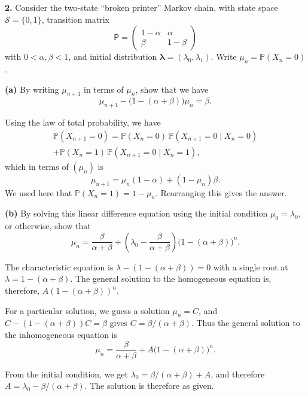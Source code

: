 \documentclass[
  a4paper,
]{article}
\theoremstyle{definition}
\theoremstyle{definition}
\theoremstyle{definition}
\theoremstyle{remark}
\begin{document}
\textbf{2.} Consider the two-state ``broken printer'' Markov chain, with state space \(\mathcal S = \{0,1\}\), transition matrix
\[ \mathsf P = \begin{pmatrix} 1-\alpha & \alpha \\
                 \beta & 1-\beta \end{pmatrix} \]
with \(0 < \alpha, \beta < 1\), and initial distribution \(\boldsymbol\lambda = (\lambda_0, \lambda_1)\). Write \(\mu_n =\mathbb P(X_n = 0)\).

\textbf{(a)} By writing \(\mu_{n+1}\) in terms of \(\mu_n\), show that we have
\[ \mu_{n+1} - \big(1-(\alpha+\beta)\big)\mu_n = \beta . \]

\begin{myanswers}

Using the law of total probability, we have
\begin{multline*}
\mathbb P(X_{n+1} = 0) = \mathbb P(X_n = 0)\,\mathbb P(X_{n+1} = 0 \mid X_n = 0) \\
+ \mathbb P(X_n = 1)\,\mathbb P(X_{n+1} = 0 \mid X_n = 1) ,
\end{multline*}
which in terms of \((\mu_n)\) is
\[ \mu_{n+1} = \mu_n (1-\alpha) + (1 - \mu_n)\beta . \]
We used here that \(\mathbb P(X_n = 1) = 1-\mu_n\).
Rearranging this gives the answer.

\end{myanswers}

\textbf{(b)} By solving this linear difference equation using the initial condition \(\mu_0 = \lambda_0\), or otherwise, show that
\[ \mu_n = \frac{\beta}{\alpha+\beta} + \left(\lambda_0 - \frac{\beta}{\alpha+\beta}\right)\big(1-(\alpha+\beta)\big)^n   . \]

\begin{myanswers}

The characteristic equation is \(\lambda - (1-(\alpha+\beta)) = 0\) with a single root at \(\lambda = 1 - (\alpha+\beta)\). The general solution to the homogeneous equation is, therefore, \(A(1-(\alpha+\beta))^n\).

For a particular solution, we guess a solution \(\mu_n = C\), and \(C - (1-(\alpha+\beta))C = \beta\) gives \(C = \beta/(\alpha+\beta)\). Thus the general solution to the inhomogeneous equation is
\[ \mu_n = \frac{\beta}{\alpha+\beta} + A\big(1-(\alpha+\beta)\big)^n .\]

From the initial condition, we get \(\lambda_0 = \beta/(\alpha+\beta) + A\), and therefore \(A = \lambda_0 - \beta/(\alpha+\beta)\). The solution is therefore as given.

\end{myanswers}
\end{document}
